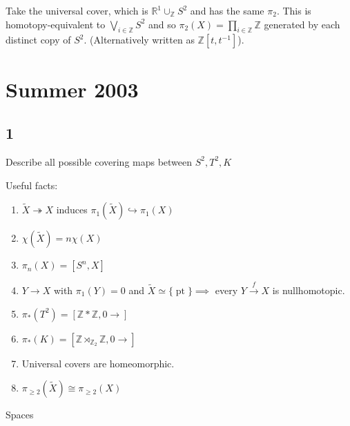 Take the universal cover, which is
\({\mathbb{R}}^1 \cup_{{\mathbb{Z}}} S^2\) and has the same \(\pi_2\).
This is homotopy-equivalent to \(\bigvee_{i\in {\mathbb{Z}}}S^2\) and so
\(\pi_2(X) = \prod_{i\in {\mathbb{Z}}} {\mathbb{Z}}\) generated by each
distinct copy of \(S^2\). (Alternatively written as
\({\mathbb{Z}}[t, t^{-1}]\)).

\hypertarget{summer-2003}{%
\section{Summer 2003}\label{summer-2003}}

\hypertarget{section-5}{%
\subsection{1}\label{section-5}}

Describe all possible covering maps between \(S^2, T^2, K\)

Useful facts:

\begin{enumerate}
\def\labelenumi{\arabic{enumi}.}
\tightlist
\item
  \(\tilde X \twoheadrightarrow X\) induces
  \(\pi_1(\tilde X) \hookrightarrow\pi_1(X)\)
\item
  \(\chi(\tilde X) = n \chi (X)\)
\item
  \(\pi_n(X) = [S^n, X]\)
\item
  \(Y \to X\) with \(\pi_1(Y) = 0\) and
  \(\tilde X \simeq{\{\operatorname{pt}\}}\implies\) every
  \(Y\xrightarrow{f} X\) is nullhomotopic.
\item
  \(\pi_*(T^2) = [{\mathbb{Z}}\ast {\mathbb{Z}}, 0\rightarrow]\)
\item
  \(\pi_*(K) = [{\mathbb{Z}}\rtimes_{{\mathbb{Z}}_2} {\mathbb{Z}}, 0\rightarrow]\)
\item
  Universal covers are homeomorphic.
\item
  \(\pi_{\geq 2}(\tilde X) \cong \pi_{\geq 2}(X)\)
\end{enumerate}

Spaces


